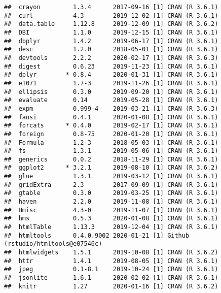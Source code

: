 \documentclass[
]{article}
\begin{document}
\begin{verbatim}
##  crayon         1.3.4      2017-09-16 [1] CRAN (R 3.6.1)                    
##  curl           4.3        2019-12-02 [1] CRAN (R 3.6.1)                    
##  data.table     1.12.8     2019-12-09 [1] CRAN (R 3.6.2)                    
##  DBI            1.1.0      2019-12-15 [1] CRAN (R 3.6.1)                    
##  dbplyr         1.4.2      2019-06-17 [1] CRAN (R 3.6.1)                    
##  desc           1.2.0      2018-05-01 [1] CRAN (R 3.6.1)                    
##  devtools       2.2.2      2020-02-17 [1] CRAN (R 3.6.3)                    
##  digest         0.6.23     2019-11-23 [1] CRAN (R 3.6.1)                    
##  dplyr        * 0.8.4      2020-01-31 [1] CRAN (R 3.6.1)                    
##  e1071          1.7-3      2019-11-26 [1] CRAN (R 3.6.1)                    
##  ellipsis       0.3.0      2019-09-20 [1] CRAN (R 3.6.1)                    
##  evaluate       0.14       2019-05-28 [1] CRAN (R 3.6.1)                    
##  expm           0.999-4    2019-03-21 [1] CRAN (R 3.6.3)                    
##  fansi          0.4.1      2020-01-08 [1] CRAN (R 3.6.1)                    
##  forcats      * 0.4.0      2019-02-17 [1] CRAN (R 3.6.1)                    
##  foreign        0.8-75     2020-01-20 [1] CRAN (R 3.6.1)                    
##  Formula        1.2-3      2018-05-03 [1] CRAN (R 3.6.1)                    
##  fs             1.3.1      2019-05-06 [1] CRAN (R 3.6.1)                    
##  generics       0.0.2      2018-11-29 [1] CRAN (R 3.6.1)                    
##  ggplot2      * 3.2.1      2019-08-10 [1] CRAN (R 3.6.2)                    
##  glue           1.3.1      2019-03-12 [1] CRAN (R 3.6.1)                    
##  gridExtra      2.3        2017-09-09 [1] CRAN (R 3.6.1)                    
##  gtable         0.3.0      2019-03-25 [1] CRAN (R 3.6.1)                    
##  haven          2.2.0      2019-11-08 [1] CRAN (R 3.6.1)                    
##  Hmisc          4.3-0      2019-11-07 [1] CRAN (R 3.6.1)                    
##  hms            0.5.3      2020-01-08 [1] CRAN (R 3.6.1)                    
##  htmlTable      1.13.3     2019-12-04 [1] CRAN (R 3.6.1)                    
##  htmltools      0.4.0.9002 2020-01-21 [1] Github (rstudio/htmltools@e07546c)
##  htmlwidgets    1.5.1      2019-10-08 [1] CRAN (R 3.6.2)                    
##  httr           1.4.1      2019-08-05 [1] CRAN (R 3.6.1)                    
##  jpeg           0.1-8.1    2019-10-24 [1] CRAN (R 3.6.1)                    
##  jsonlite       1.6.1      2020-02-02 [1] CRAN (R 3.6.1)                    
##  knitr          1.27       2020-01-16 [1] CRAN (R 3.6.2)                    

\end{verbatim}
\end{document}
